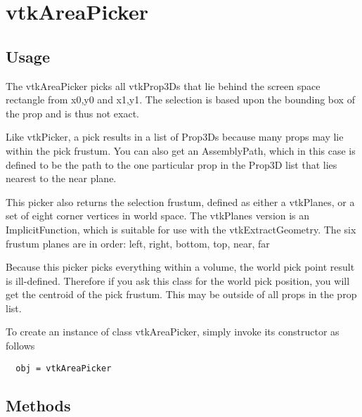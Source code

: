 \section{vtkAreaPicker}

\subsection{Usage}

 The vtkAreaPicker picks all vtkProp3Ds that lie behind the screen space 
 rectangle from x0,y0 and x1,y1. The selection is based upon the bounding
 box of the prop and is thus not exact.

 Like vtkPicker, a pick results in a list of Prop3Ds because many props may 
 lie within the pick frustum. You can also get an AssemblyPath, which in this
 case is defined to be the path to the one particular prop in the Prop3D list
 that lies nearest to the near plane. 

 This picker also returns the selection frustum, defined as either a
 vtkPlanes, or a set of eight corner vertices in world space. The vtkPlanes 
 version is an ImplicitFunction, which is suitable for use with the
 vtkExtractGeometry. The six frustum planes are in order: left, right, 
 bottom, top, near, far

 Because this picker picks everything within a volume, the world pick point 
 result is ill-defined. Therefore if you ask this class for the world pick 
 position, you will get the centroid of the pick frustum. This may be outside
 of all props in the prop list.


To create an instance of class vtkAreaPicker, simply
invoke its constructor as follows
\begin{verbatim}
  obj = vtkAreaPicker
\end{verbatim}
\subsection{Methods}

